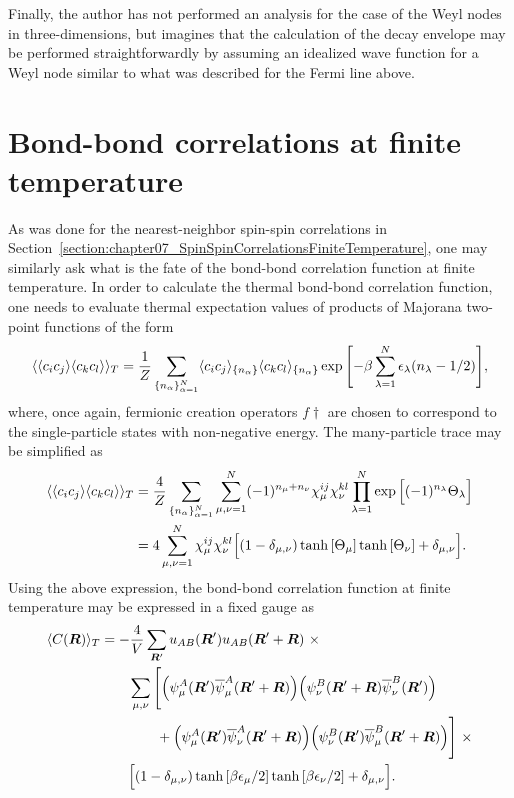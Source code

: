 Finally, the author has not performed an analysis for the case of the Weyl nodes in three-dimensions, but imagines that the calculation of the decay envelope may be performed straightforwardly by assuming an idealized wave function for a Weyl node similar to what was described for the Fermi line above.


%
%
\section{Bond-bond correlations at finite temperature}
\label{section:chapter07_BondBondCorrelationsFiniteTemperature}
%
%
As was done for the nearest-neighbor spin-spin correlations in Section~\ref{section:chapter07_SpinSpinCorrelationsFiniteTemperature}, one may similarly ask what is the fate of the bond-bond correlation function at finite temperature.
In order to calculate the thermal bond-bond correlation function, one needs to evaluate thermal expectation values of products of Majorana two-point functions of the form
%
\begin{equation}
	\langle \langle c_i c_j \rangle\langle c_k c_l \rangle \rangle_{T} = \frac{1}{Z} \sum_{\{n_\alpha\}_{\alpha=1}^N} \langle c_i c_j \rangle_{\{n_\alpha\}} \langle c_k c_l \rangle_{\{n_\alpha\}} \exp{\left[-\beta \sum_{\lambda=1}^N \epsilon_\lambda (n_\lambda - 1/2)\right]},
\end{equation}
%
where, once again, fermionic creation operators $f\dag$ are chosen to correspond to the single-particle states with non-negative energy.
The many-particle trace may be simplified as
%
\begin{align}
	\langle \langle c_i c_j \rangle\langle c_k c_l \rangle \rangle_{T} 	&= \frac{4}{Z} \sum_{\{n_\alpha\}_{\alpha=1}^N} \sum_{\mu,\nu=1}^N (-1)^{n_\mu+n_\nu} \chi^{ij}_\mu \chi^{kl}_\nu \prod_{\lambda=1}^N \exp{\Big[(-1)^{n_\lambda} \Theta_\lambda \Big]} \nonumber\\
	&= 4 \sum_{\mu,\nu=1}^N \chi^{ij}_\mu \chi^{kl}_\nu \Big[ (1-\delta_{\mu,\nu}) \tanh{[\Theta_\mu]} \tanh{[\Theta_\nu]} + \delta_{\mu,\nu} \Big].
\end{align}
%
Using the above expression, the bond-bond correlation function at finite temperature may be expressed in a fixed gauge as
%
\begin{align}
	\langle C(\bm{R}) \rangle_T	&= -\frac{4}{V} \sum_{\bm{R}'} u_{AB}(\bm{R}') u_{AB}(\bm{R}' + \bm{R})~\times \nonumber\\
	&\qquad\sum_{\mu,\nu} \Bigg[\Big(\psi_{\mu}^A(\bm{R}') \overline{\psi}_{\mu}^A(\bm{R}' + \bm{R})\Big) \Big(\psi_{\nu}^B(\bm{R}' + \bm{R}) \overline{\psi}_{\nu}^B(\bm{R}') \Big) \nonumber\\
	&\qquad\qquad+ \Big(\psi_{\mu}^A(\bm{R}') \overline{\psi}_{\nu}^A(\bm{R}' + \bm{R})\Big) \Big(\psi_{\nu}^B(\bm{R}') \overline{\psi}_{\mu}^B(\bm{R}' + \bm{R}) \Big)\Bigg]~\times \nonumber\\
	&\qquad\Big[(1-\delta_{\mu,\nu})\tanh{[\beta \epsilon_\mu/2]}\tanh{[\beta \epsilon_\nu/2]} + \delta_{\mu,\nu} \Big].
\end{align}
